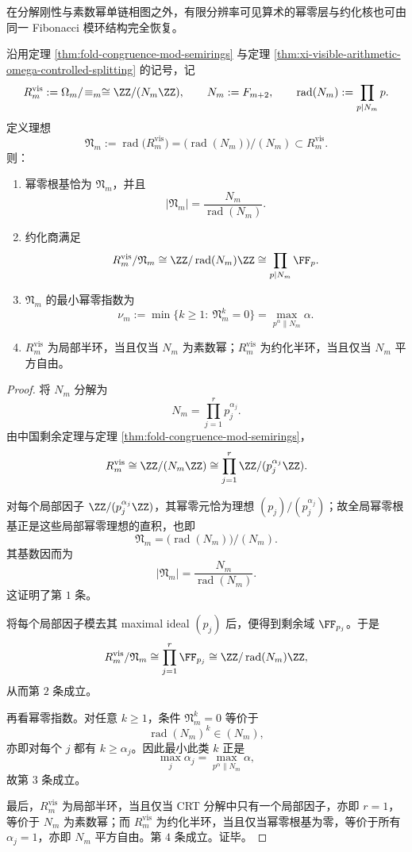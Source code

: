 在分解刚性与素数幂单链相图之外，有限分辨率可见算术的幂零层与约化核也可由同一 Fibonacci 模环结构完全恢复。

\begin{theorem}\label{thm:xi-visible-arithmetic-nilradical-semisimple-thickness}
沿用定理 \ref{thm:fold-congruence-mod-semirings} 与定理 \ref{thm:xi-visible-arithmetic-omega-controlled-splitting} 的记号，记
\[
R_m^{\mathrm{vis}}
:=
\Omega_m/\!\equiv_m
\cong
\ZZ/(N_m\ZZ),
\qquad
N_m:=F_{m+2},
\qquad
\operatorname{rad}(N_m):=\prod_{p\mid N_m}p.
\]
定义理想
\[
\mathfrak N_m:=\operatorname{rad}\bigl(R_m^{\mathrm{vis}}\bigr)
=
\bigl(\operatorname{rad}(N_m)\bigr)/(N_m)
\subset R_m^{\mathrm{vis}}.
\]
则：
\begin{enumerate}
  \item 幂零根基恰为 \(\mathfrak N_m\)，并且
  \[
  |\mathfrak N_m|
  =
  \frac{N_m}{\operatorname{rad}(N_m)}.
  \]
  \item 约化商满足
  \[
  R_m^{\mathrm{vis}}/\mathfrak N_m
  \cong
  \ZZ/\operatorname{rad}(N_m)\ZZ
  \cong
  \prod_{p\mid N_m}\FF_p.
  \]
  \item \(\mathfrak N_m\) 的最小幂零指数为
  \[
  \nu_m
  :=
  \min\{k\ge 1:\ \mathfrak N_m^k=0\}
  =
  \max_{p^\alpha\parallel N_m}\alpha.
  \]
  \item \(R_m^{\mathrm{vis}}\) 为局部半环，当且仅当 \(N_m\) 为素数幂；\(R_m^{\mathrm{vis}}\) 为约化半环，当且仅当 \(N_m\) 平方自由。
\end{enumerate}
\end{theorem}
\begin{proof}
将 \(N_m\) 分解为
\[
N_m=\prod_{j=1}^{r}p_j^{\alpha_j}.
\]
由中国剩余定理与定理 \ref{thm:fold-congruence-mod-semirings}，
\[
R_m^{\mathrm{vis}}
\cong
\ZZ/(N_m\ZZ)
\cong
\prod_{j=1}^{r}\ZZ/(p_j^{\alpha_j}\ZZ).
\]

对每个局部因子 \(\ZZ/(p_j^{\alpha_j}\ZZ)\)，其幂零元恰为理想 \((p_j)/(p_j^{\alpha_j})\)；故全局幂零根基正是这些局部幂零理想的直积，也即
\[
\mathfrak N_m
=
\bigl(\operatorname{rad}(N_m)\bigr)/(N_m).
\]
其基数因而为
\[
|\mathfrak N_m|
=
\frac{N_m}{\operatorname{rad}(N_m)}.
\]
这证明了第 \(1\) 条。

将每个局部因子模去其 maximal ideal \((p_j)\) 后，便得到剩余域 \(\FF_{p_j}\)。于是
\[
R_m^{\mathrm{vis}}/\mathfrak N_m
\cong
\prod_{j=1}^{r}\FF_{p_j}
\cong
\ZZ/\operatorname{rad}(N_m)\ZZ,
\]
从而第 \(2\) 条成立。

再看幂零指数。对任意 \(k\ge 1\)，条件 \(\mathfrak N_m^k=0\) 等价于
\[
\operatorname{rad}(N_m)^k\in (N_m),
\]
亦即对每个 \(j\) 都有 \(k\ge \alpha_j\)。因此最小此类 \(k\) 正是
\[
\max_j\alpha_j
=
\max_{p^\alpha\parallel N_m}\alpha,
\]
故第 \(3\) 条成立。

最后，\(R_m^{\mathrm{vis}}\) 为局部半环，当且仅当 CRT 分解中只有一个局部因子，亦即 \(r=1\)，等价于 \(N_m\) 为素数幂；而 \(R_m^{\mathrm{vis}}\) 为约化半环，当且仅当幂零根基为零，等价于所有 \(\alpha_j=1\)，亦即 \(N_m\) 平方自由。第 \(4\) 条成立。证毕。
\end{proof}

\endinput

